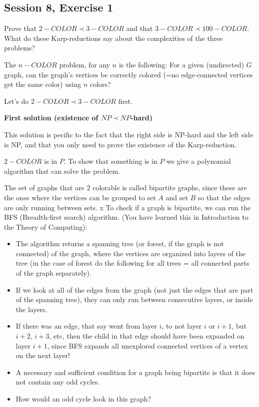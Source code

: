 \subsection {Session 8, Exercise 1}
\label{8_1}


Prove that $2-COLOR \prec 3-COLOR$ and that $3-COLOR \prec 100-COLOR$. What do these Karp-reductions say about the complexities of the three problems?


The $n-COLOR$ problem, for any $n$ is the following:  For a given (undirected) $G$ graph, can the graph's vertices be correctly colored (=no edge-connected vertices get the same color) using $n$ colors? 

Let's do $2-COLOR \prec 3-COLOR$ first.

\separate
\separate

\textbf{First solution (existence of $NP \prec NP$-hard)}

This solution is pecific to the fact that the right side is NP-hard and the left side is NP, and that you only need to prove the existence of the Karp-reduction.

$2-COLOR$ is in $P$. To show that something is in $P$ we give a polynomial algorithm that can solve the problem.

The set of graphs that are $2$ colorable is called bipartite graphs, since these are the ones where the vertices can be grouped to set $A$ and set $B$ so that the edges are only running between sets.
x
To check if a graph is bipartite, we can run the BFS (Breadth-first search) algorithm. (You have learned this in Introduction to the Theory of Computing):

\begin{itemize}
    \item The algorithm returns a spanning tree (or forest, if the graph is not connected) of the graph, where the vertices are organized into layers of the tree (in the case of forest do the following for all trees = all connected parts of the graph separately).
    \item If we look at all of the edges from the graph (not just the edges that are part of the spanning tree), they can only run between consecutive layers, or inside the layers. 
    \item If there was an edge, that say went from layer $i$, to not layer $i$ or $i+1$, but $i+2$, $i+3$, etc, then the child in that edge should have been expanded on layer $i+1$, since BFS expands all unexplored connected vertices of a vertex on the next layer!
    \item A necessary and sufficient condition for a graph being bipartite is that it does not contain any odd cycles.
    \item How would an odd cycle look in this graph?
\end{itemize}

